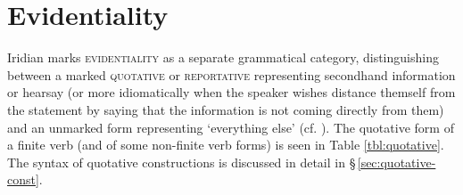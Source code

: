 \section{Evidentiality}\label{sec:quotative}

Iridian marks {\scshape evidentiality} as a separate grammatical category,
distinguishing between a marked {\scshape quotative} or {\scshape reportative}
representing secondhand information or hearsay (or more idiomatically when the
speaker wishes distance themself from the statement by saying that the
information is not coming directly from them) and an unmarked form representing
`everything else' (cf. \cite[31-33]{aikhenvald2004}). The quotative form of a
finite verb (and of some non-finite verb forms) is seen in Table
\ref{tbl:quotative}. The syntax of quotative constructions is discussed in
detail in \S\,\ref{sec:quotative-const}.


